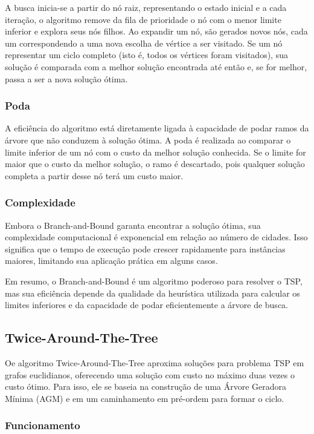 \documentclass[12pt]{article}
\begin{document}
A busca inicia-se a partir do nó raiz, representando o estado inicial e a cada iteração, o algoritmo remove da fila de prioridade o nó com o menor limite inferior e explora seus nós filhos. Ao expandir um nó, são gerados novos nós, cada um correspondendo a uma nova escolha de vértice a ser visitado. Se um nó representar um ciclo completo (isto é, todos os vértices foram visitados), sua solução é comparada com a melhor solução encontrada até então e, se for melhor, passa a ser a nova solução ótima.

\subsubsection{Poda}

A eficiência do algoritmo está diretamente ligada à capacidade de podar ramos da árvore que não conduzem à solução ótima. A poda é realizada ao comparar o limite inferior de um nó com o custo da melhor solução conhecida. Se o limite for maior que o custo da melhor solução, o ramo é descartado, pois qualquer solução completa a partir desse nó terá um custo maior.

\subsubsection{Complexidade}

Embora o Branch-and-Bound garanta encontrar a solução ótima, sua complexidade computacional é exponencial em relação ao número de cidades. Isso significa que o tempo de execução pode crescer rapidamente para instâncias maiores, limitando sua aplicação prática em alguns casos.

Em resumo, o Branch-and-Bound é um algoritmo poderoso para resolver o TSP, mas sua eficiência depende da qualidade da heurística utilizada para calcular os limites inferiores e da capacidade de podar eficientemente a árvore de busca.

\subsection{Twice-Around-The-Tree}

Oe algoritmo Twice-Around-The-Tree aproxima soluções para problema TSP em grafos euclidianos, oferecendo uma solução com custo no máximo duas vezes o custo ótimo. Para isso, ele se baseia na construção de uma Árvore Geradora Mínima (AGM) e em um caminhamento em pré-ordem para formar o ciclo.

\subsubsection{Funcionamento}
\end{document}
